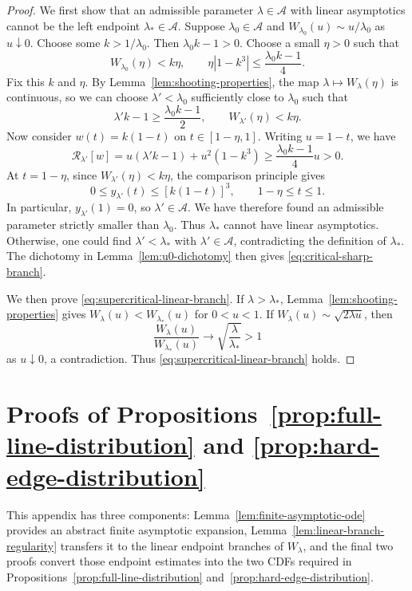 \documentclass[a4paper,fleqn]{cas-sc}
\newif\ifshowrevisions
\DeclareRobustCommand{\rev}[1]{{\ifshowrevisions\color{blue}\fi#1}}
\numberwithin{equation}{section}
\theoremstyle{plain}
\theoremstyle{definition}
\begin{document}
\begin{proof}
We first show that an admissible parameter $\lambda\in\mathcal A$ with
linear asymptotics cannot be the left endpoint $\lambda_*\in\mathcal A$.
Suppose $\lambda_0\in\mathcal A$ and
\(W_{\lambda_0}(u)\sim u/\lambda_0\) as \(u\downarrow 0\).
Choose some \(k>1/\lambda_0\). Then
\(\lambda_0k-1>0\). Choose \rev{a} small \(\eta>0\) such that
\[
 W_{\lambda_0}(\eta)<k\eta,
 \qquad
 \eta|1-k^3|\le\frac{\lambda_0k-1}{4}.
\]
Fix this \(k\) and \(\eta\). By Lemma~\ref{lem:shooting-properties}, the map
\(\lambda\mapsto W_\lambda(\eta)\) is continuous, so we can choose \(\lambda'<\lambda_0\) sufficiently close
to \(\lambda_0\) such that
\[
 \lambda'k-1\ge\frac{\lambda_0k-1}{2},
 \qquad
 W_{\lambda'}(\eta)<k\eta.
\]
Now consider $w(t)=k(1-t)$ on $t\in[1-\eta,1]$.  Writing
$u=1-t$, we have
\[
 \mathcal R_{\lambda'}[w]
 =u(\lambda'k-1)+u^2(1-k^3)
 \ge\frac{\lambda_0k-1}{4}u>0.
\]
At \(t=1-\eta\), since \(W_{\lambda'}(\eta)<k\eta\), the comparison principle gives
\[
 0\le y_{\lambda'}(t)\le[k(1-t)]^3,
 \qquad 1-\eta\le t\le1.
\]
In particular, \(y_{\lambda'}(1)=0\), so \(\lambda'\in\mathcal A\).  We have
therefore found an admissible parameter strictly smaller than \(\lambda_0\).
Thus $\lambda_*$ cannot have linear asymptotics.  Otherwise, one could
find $\lambda'<\lambda_*$ with $\lambda'\in\mathcal A$, contradicting
the definition of $\lambda_*$.  The dichotomy in
Lemma~\ref{lem:u0-dichotomy} then gives
\eqref{eq:critical-sharp-branch}.

We then prove \eqref{eq:supercritical-linear-branch}.
If \(\lambda>\lambda_*\), Lemma~\ref{lem:shooting-properties} gives
$W_\lambda(u)<W_{\lambda_*}(u)$ for $0<u<1$.  If
$W_\lambda(u)\sim\sqrt{2\lambda u}$, then
\[
 \frac{W_\lambda(u)}{W_{\lambda_*}(u)}\longrightarrow
 \sqrt{\frac \lambda{\lambda_*}}>1
\]
as \(u\downarrow0\), a contradiction.  Thus
\eqref{eq:supercritical-linear-branch} holds.
\end{proof}

\section{Proofs of Propositions~\ref{prop:full-line-distribution} and \ref{prop:hard-edge-distribution} }
\label{app:regularity}

This appendix has three components: Lemma~\ref{lem:finite-asymptotic-ode}
provides an abstract finite asymptotic expansion,
Lemma~\ref{lem:linear-branch-regularity} transfers it to the linear endpoint
branches of $W_\lambda$, and the final two proofs convert those endpoint
estimates into the two CDFs required in
Propositions~\ref{prop:full-line-distribution}
and~\ref{prop:hard-edge-distribution}.
\end{document}
